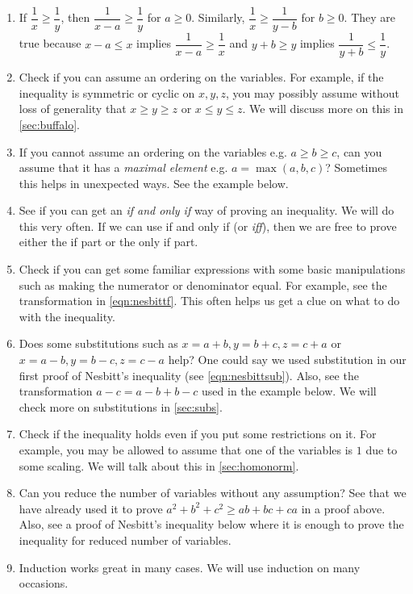 \documentclass{subfile}
\begin{document}
		\begin{enumerate}[\itshape (i)]
			\item If $\dfrac{1}{x}\geq\dfrac{1}{y}$, then $\dfrac{1}{x-a}\geq\dfrac{1}{y}$ for $a\geq0$. Similarly, $\dfrac{1}{x}\geq\dfrac{1}{y-b}$ for $b\geq0$. They are true because $x-a\leq x$ implies $\dfrac{1}{x-a}\geq\dfrac{1}{x}$ and $y+b\geq y$ implies $\dfrac{1}{y+b}\leq\dfrac{1}{y}$.
			\item Check if you can assume an ordering on the variables. For example, if the inequality is symmetric or cyclic on $x,y,z$, you may possibly assume without loss of generality that $x\geq y\geq z$ or $x\leq y\leq z$. We will discuss more on this in \autoref{sec:buffalo}.
			\item If you cannot assume an ordering on the variables e.g. $a\geq b\geq c$, can you assume that it has a \textit{maximal element} e.g. $a=\max(a,b,c)$? Sometimes this helps in unexpected ways. See the example below.
			\item See if you can get an \textit{if and only if} way of proving an inequality. We will do this very often. If we can use if and only if (or \textit{iff}), then we are free to prove either the if part or the only if part.
			\item Check if you can get some familiar expressions with some basic manipulations such as making the numerator or denominator equal. For example, see the transformation in \ref{eqn:nesbittf}. This often helps us get a clue on what to do with the inequality.
			\item Does some substitutions such as $x=a+b,y=b+c,z=c+a$ or $x=a-b,y=b-c,z=c-a$ help? One could say we used substitution in our first proof of Nesbitt's inequality (see \ref{eqn:nesbittsub}). Also, see the transformation $a-c=a-b+b-c$ used in the example below. We will check more on substitutions in \autoref{sec:subs}.
			\item Check if the inequality holds even if you put some restrictions on it. For example, you may be allowed to assume that one of the variables is $1$ due to some scaling. We will talk about this in \autoref{sec:homonorm}.
			\item Can you reduce the number of variables without any assumption? See that we have already used it to prove $a^2+b^2+c^2\geq ab+bc+ca$ in a proof above. Also, see a proof of Nesbitt's inequality below where it is enough to prove the inequality for reduced number of variables.
			\item Induction works great in many cases. We will use induction on many occasions.
		\end{enumerate}
\end{document}
